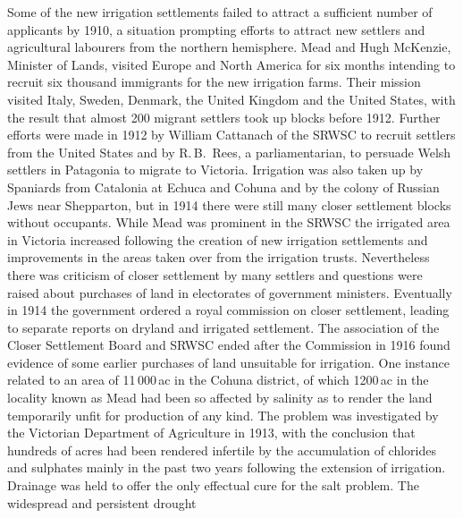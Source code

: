 Some of the new irrigation settlements failed to attract a sufficient
number of applicants by 1910, a situation prompting efforts to attract
new settlers and agricultural labourers from the northern hemisphere.
Mead and Hugh McKenzie, Minister of Lands, visited Europe and North
America for six months intending to recruit six thousand immigrants
for the new irrigation farms. Their mission visited Italy, Sweden, Denmark, the United
Kingdom and the United States, with the result that almost 200 migrant
settlers took up blocks before 1912.
Further efforts were made in 1912 by William Cattanach of the SRWSC to
recruit settlers from the United States and by R.\,B.~Rees, a
parliamentarian, to persuade Welsh settlers in Patagonia to migrate to
Victoria.  Irrigation was also taken
up by Spaniards from Catalonia at Echuca and Cohuna and by the colony
of Russian Jews near Shepparton, but in 1914 there were still many
closer settlement blocks without occupants.  While Mead
was prominent in the SRWSC the irrigated area in Victoria increased
following the creation of new irrigation settlements and improvements
in the areas taken over from the irrigation trusts.  Nevertheless
there was criticism of closer settlement by many settlers and
questions were raised about purchases of land in electorates of
government ministers.  Eventually in 1914 the government ordered a
royal commission on closer settlement, leading to separate reports on
dryland and irrigated settlement.
The association of the Closer Settlement Board and SRWSC ended after
the Commission in 1916 found evidence of some earlier purchases of
land unsuitable for irrigation.  One instance related to an area of
11\,000\,ac in the Cohuna district, of which 1200\,ac in the locality
known as Mead had been so affected by salinity as to render the land
temporarily unfit for production of any kind.  The problem was
investigated by the Victorian Department of Agriculture in 1913, with
the conclusion that hundreds of acres had been rendered infertile by
the accumulation of chlorides and sulphates mainly in the past two
years following the extension of irrigation.  Drainage was held to offer the only effectual
cure for the salt problem.  The widespread and persistent drought

